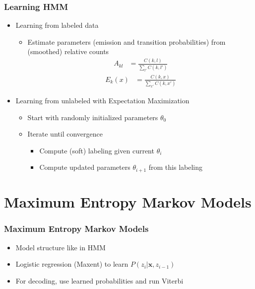 \documentclass[usenames,dvipsnames]{beamer}
\newcommand{\x}{\mathbf{x}}
\begin{document}
\begin{frame}
  \frametitle{Learning HMM}
  \begin{itemize}
  \item Learning from labeled data
    \pause
    \begin{itemize}
    \item Estimate parameters (emission and transition probabilities)
      from (smoothed) relative counts
      \pause
      \begin{align*}
        A_{kl} & = \frac{C(k,l)}{\sum_{l'} C(k,l')}
      \end{align*}
      \begin{align*}
        E_k(x) & = \frac{C(k,x)}{\sum_{x'} C(k,x')}
      \end{align*}
    \end{itemize}
  \item Learning from unlabeled with Expectation Maximization
      \begin{itemize}
      \item Start with randomly initialized parameters $\theta_0$
      \item Iterate until convergence
        \begin{itemize}
        \item Compute (soft) labeling given current $\theta_i$
        \item Compute updated parameters $\theta_{i+1}$ from this labeling
        \end{itemize}
      \end{itemize}
  \end{itemize}
\end{frame}

\section{Maximum Entropy Markov Models}
\begin{frame}
  \frametitle{Maximum Entropy Markov Models}
  \begin{itemize}
  \item Model structure like in HMM
  \item Logistic regression (Maxent) to learn $P(z_i|\x,z_{i-1})$
  \item For decoding, use learned probabilities and run Viterbi
  \end{itemize}
\end{frame}
\end{document}
